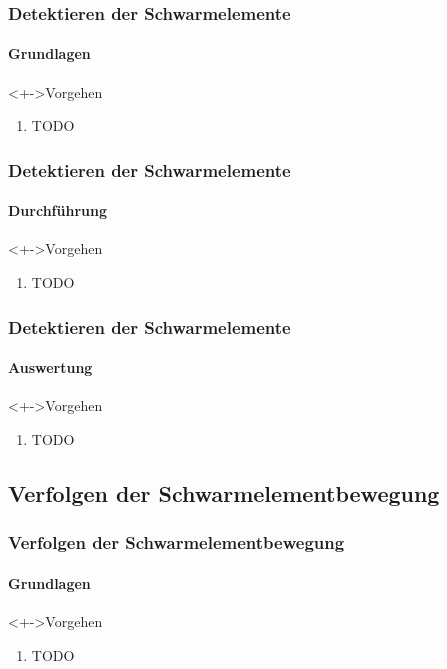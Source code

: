 \documentclass{beamer}
\begin{document}
\begin{frame}
	\frametitle{Detektieren der Schwarmelemente}\framesubtitle{Grundlagen}
	\begin{block}<+->{Vorgehen}
		\begin{enumerate}
		  \item TODO
		\end{enumerate}
	\end{block}
\end{frame}


\begin{frame}
	\frametitle{Detektieren der Schwarmelemente}\framesubtitle{Durchf\"uhrung}
	\begin{block}<+->{Vorgehen}
		\begin{enumerate}
		  \item TODO
		\end{enumerate}
	\end{block}
\end{frame}


\begin{frame}
	\frametitle{Detektieren der Schwarmelemente}\framesubtitle{Auswertung}
	\begin{block}<+->{Vorgehen}
		\begin{enumerate}
		  \item TODO
		\end{enumerate}
	\end{block}
\end{frame}


\subsection[Verfolgung]{Verfolgen der Schwarmelementbewegung}


\begin{frame}
	\frametitle{Verfolgen der Schwarmelementbewegung}\framesubtitle{Grundlagen}
	\begin{block}<+->{Vorgehen}
		\begin{enumerate}
		  \item TODO 
		\end{enumerate}
	\end{block}
\end{frame}
\end{document}
